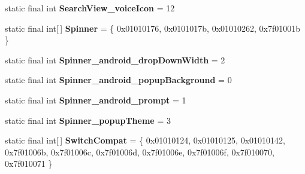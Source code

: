\begin{DoxyCompactItemize}
\item 
\hypertarget{classandroid_1_1support_1_1v7_1_1appcompat_1_1_r_1_1styleable_acf6e3bc9a9fa2ff39a17969a13f185d1}{}static final int {\bfseries Search\+View\+\_\+voice\+Icon} = 12\label{classandroid_1_1support_1_1v7_1_1appcompat_1_1_r_1_1styleable_acf6e3bc9a9fa2ff39a17969a13f185d1}

\item 
\hypertarget{classandroid_1_1support_1_1v7_1_1appcompat_1_1_r_1_1styleable_a63a8e6de3d44afcd176eaa79214fd8a5}{}static final int\mbox{[}$\,$\mbox{]} {\bfseries Spinner} = \{ 0x01010176, 0x0101017b, 0x01010262, 0x7f01001b \}\label{classandroid_1_1support_1_1v7_1_1appcompat_1_1_r_1_1styleable_a63a8e6de3d44afcd176eaa79214fd8a5}

\item 
\hypertarget{classandroid_1_1support_1_1v7_1_1appcompat_1_1_r_1_1styleable_a636540870b1adf3ad212d48846883084}{}static final int {\bfseries Spinner\+\_\+android\+\_\+drop\+Down\+Width} = 2\label{classandroid_1_1support_1_1v7_1_1appcompat_1_1_r_1_1styleable_a636540870b1adf3ad212d48846883084}

\item 
\hypertarget{classandroid_1_1support_1_1v7_1_1appcompat_1_1_r_1_1styleable_a756e7d7ebf3758cf9548f0450c558c18}{}static final int {\bfseries Spinner\+\_\+android\+\_\+popup\+Background} = 0\label{classandroid_1_1support_1_1v7_1_1appcompat_1_1_r_1_1styleable_a756e7d7ebf3758cf9548f0450c558c18}

\item 
\hypertarget{classandroid_1_1support_1_1v7_1_1appcompat_1_1_r_1_1styleable_a2b020d064f01dd162a9186546be615ed}{}static final int {\bfseries Spinner\+\_\+android\+\_\+prompt} = 1\label{classandroid_1_1support_1_1v7_1_1appcompat_1_1_r_1_1styleable_a2b020d064f01dd162a9186546be615ed}

\item 
\hypertarget{classandroid_1_1support_1_1v7_1_1appcompat_1_1_r_1_1styleable_ab9af518c5e821e5b40a299636324b4e2}{}static final int {\bfseries Spinner\+\_\+popup\+Theme} = 3\label{classandroid_1_1support_1_1v7_1_1appcompat_1_1_r_1_1styleable_ab9af518c5e821e5b40a299636324b4e2}

\item 
\hypertarget{classandroid_1_1support_1_1v7_1_1appcompat_1_1_r_1_1styleable_aabe688560752254f2288f3eaf9439737}{}static final int\mbox{[}$\,$\mbox{]} {\bfseries Switch\+Compat} = \{ 0x01010124, 0x01010125, 0x01010142, 0x7f01006b, 0x7f01006c, 0x7f01006d, 0x7f01006e, 0x7f01006f, 0x7f010070, 0x7f010071 \}\label{classandroid_1_1support_1_1v7_1_1appcompat_1_1_r_1_1styleable_aabe688560752254f2288f3eaf9439737}


\end{DoxyCompactItemize}
